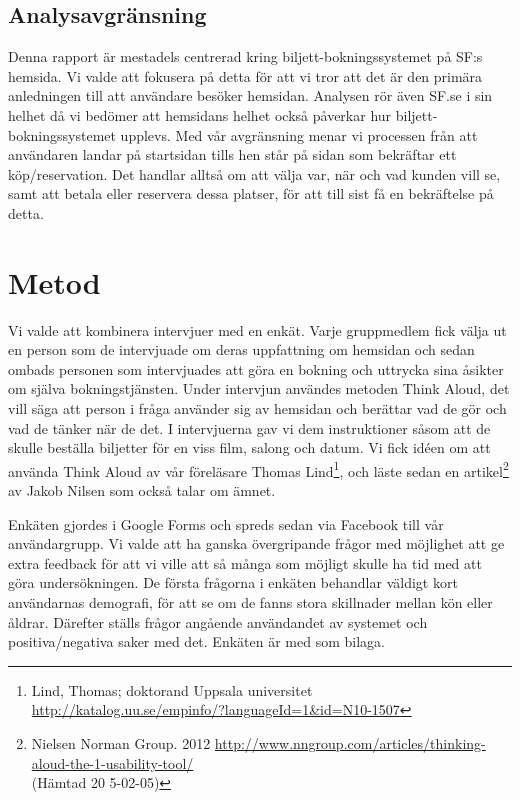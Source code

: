 \documentclass[swedish,a4paper,11pt]{article}
\begin{document}
\subsection{Analysavgränsning}
Denna rapport är mestadels centrerad kring biljett-bokningssystemet på SF:s hemsida. Vi valde att fokusera på detta för att vi tror att det är den primära anledningen till att användare besöker hemsidan. Analysen rör även SF.se i sin helhet då vi bedömer att hemsidans helhet också påverkar hur biljett-bokningssystemet upplevs. Med vår avgränsning menar vi processen från att användaren landar på startsidan tills hen står på sidan som bekräftar ett köp/reservation. Det handlar alltså om att välja var, när och vad kunden vill se, samt att betala eller reservera dessa platser, för att till sist få en bekräftelse på detta.

\newpage
\section{Metod}
Vi valde att kombinera intervjuer med en enkät. Varje gruppmedlem fick välja ut en person som de intervjuade om deras uppfattning om hemsidan och sedan ombads personen som intervjuades att göra en bokning och uttrycka sina åsikter om själva bokningstjänsten. Under intervjun användes metoden Think Aloud, det vill säga att person i fråga använder sig av hemsidan och berättar vad de gör och vad de tänker när de det. I intervjuerna gav vi dem instruktioner såsom att de skulle beställa biljetter för en viss film, salong och datum. Vi fick idéen om att använda Think Aloud av vår föreläsare Thomas Lind\footnote{Lind, Thomas; doktorand Uppsala universitet\\
\url{http://katalog.uu.se/empinfo/?languageId=1&id=N10-1507}}, och läste sedan en artikel\footnote{Nielsen Norman Group. 2012 \url{http://www.nngroup.com/articles/thinking-aloud-the-1-usability-tool/}\\{(Hämtad 20
5-02-05)}} av Jakob Nilsen som också talar om ämnet.

Enkäten gjordes i Google Forms och spreds sedan via Facebook till vår användargrupp. Vi valde att ha ganska övergripande frågor med möjlighet att ge extra feedback för att vi ville att så många som möjligt skulle ha tid med att göra undersökningen. De första frågorna i enkäten behandlar väldigt kort användarnas demografi, för att se om de fanns stora skillnader mellan kön eller åldrar. Därefter ställs frågor angående användandet av systemet och positiva/negativa saker med det. Enkäten är med som bilaga.
\end{document}

